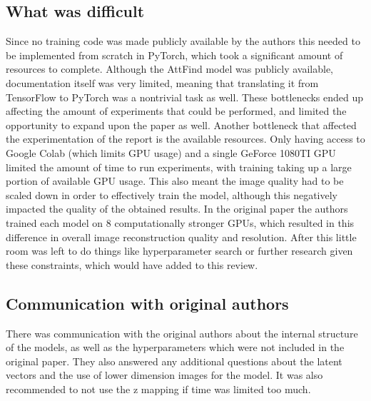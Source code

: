 \subsection{What was difficult}
Since no training code was made publicly available by the authors this needed to be implemented from scratch in PyTorch, which took a significant amount of resources to complete. Although the AttFind model was publicly available, documentation itself was very limited, meaning that translating it from TensorFlow to PyTorch was a nontrivial task as well. These bottlenecks ended up affecting the amount of experiments that could be performed, and limited the opportunity to expand upon the paper as well. Another bottleneck that affected the experimentation of the report is the available resources. Only having access to Google Colab (which limits GPU usage) and a single GeForce 1080TI GPU limited the amount of time to run experiments, with training taking up a large portion of available GPU usage. This also meant the image quality had to be scaled down in order to effectively train the model, although this negatively impacted the quality of the obtained results. In the original paper the authors trained each model on 8 computationally stronger GPUs, which resulted in this difference in overall image reconstruction quality and resolution. After this little room was left to do things like hyperparameter search or further research given these constraints, which would have added to this review.

\subsection{Communication with original authors}
There was communication with the original authors about the internal structure of the models, as well as the hyperparameters which were not included in the original paper. They also answered any additional questions about the latent vectors and the use of lower dimension images for the model. It was also recommended to not use the z mapping if time was limited too much.
